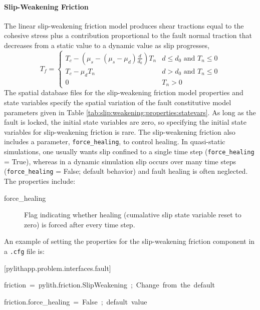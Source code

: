 \paragraph{\label{sec:friction:slip:weakening}Slip-Weakening Friction}

The linear slip-weakening friction model produces shear tractions
equal to the cohesive stress plus a contribution proportional to the
fault normal traction that decreases from a static value to a dynamic
value as slip progresses,
\begin{equation}
T_{f}=\begin{cases}
T_{c}-(\mu_{s}-(\mu_{s}-\mu_{d})\frac{d}{d_{0}})T_{n} & d\leq d_{0}\text{ and }T_{n}\leq0\\
T_{c}-\mu_{d}T_{n} & d>d_{0}\text{ and }T_{n}\leq0\\
0 & T_{n}>0
\end{cases}
\end{equation}
The spatial database files for the slip-weakening friction model properties
and state variables specify the spatial variation of the fault constitutive
model parameters given in Table \ref{tab:slip:weakening:properties:statevars}.
As long as the fault is locked, the initial state variables are zero,
so specifying the initial state variables for slip-weakening friction
is rare. The slip-weakening friction also includes a parameter, \texttt{force\_healing},
to control healing. In quasi-static simulations, one usually wants
slip confined to a single time step (\texttt{force\_healing} = True),
whereas in a dynamic simulation slip occurs over many time steps (\texttt{force\_healing}
= False; default behavior) and fault healing is often neglected. The
properties include:
\begin{description}
\item [{force\_healing}] Flag indicating whether healing (cumalative slip
state variable reset to zero) is forced after every time step.
\end{description}
An example of setting the properties for the slip-weakening friction
component in a \texttt{.cfg} file is:
\begin{lyxcode}
{[}pylithapp.problem.interfaces.fault{]}

friction~=~pylith.friction.SlipWeakening~;~Change~from~the~default

friction.force\_healing~=~False~;~default~value
\end{lyxcode}
